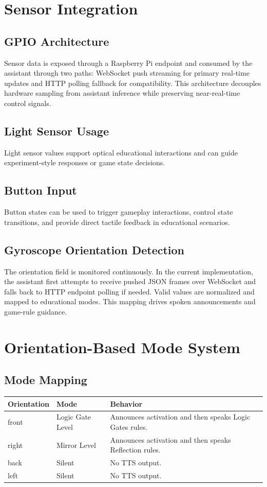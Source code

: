 \documentclass[12pt,a4paper]{article}
\begin{document}
\section{Sensor Integration}

\subsection{GPIO Architecture}
Sensor data is exposed through a Raspberry Pi endpoint and consumed by the assistant through two paths: WebSocket push streaming for primary real-time updates and HTTP polling fallback for compatibility. This architecture decouples hardware sampling from assistant inference while preserving near-real-time control signals.

\subsection{Light Sensor Usage}
Light sensor values support optical educational interactions and can guide experiment-style responses or game state decisions.

\subsection{Button Input}
Button states can be used to trigger gameplay interactions, control state transitions, and provide direct tactile feedback in educational scenarios.

\subsection{Gyroscope Orientation Detection}
The orientation field is monitored continuously. In the current implementation, the assistant first attempts to receive pushed JSON frames over WebSocket and falls back to HTTP endpoint polling if needed. Valid values are normalized and mapped to educational modes. This mapping drives spoken announcements and game-rule guidance.

\section{Orientation-Based Mode System}

\subsection{Mode Mapping}
\begin{longtable}{|>{\raggedright\arraybackslash}p{}|>{\raggedright\arraybackslash}p{}|>{\raggedright\arraybackslash}p{}|}
\hline
\textbf{Orientation} & \textbf{Mode} & \textbf{Behavior} \\
\hline
front & Logic Gate Level & Announces activation and then speaks Logic Gates rules. \\
\hline
right & Mirror Level & Announces activation and then speaks Reflection rules. \\
\hline
back & Silent & No TTS output. \\
\hline
left & Silent & No TTS output. \\
\hline
\end{longtable}
\end{document}
